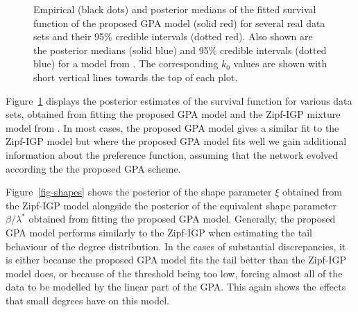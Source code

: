 \documentclass[
  sn-basic,
  10pt,
]{sn-jnl}
\theoremstyle{plain}
\theoremstyle{plain}
\theoremstyle{remark}
\begin{document}
\begin{figure}


\caption{\label{fig-real1}Empirical (black dots) and posterior medians
of the fitted survival function of the proposed GPA model (solid red)
for several real data sets and their 95\% credible intervals (dotted
red). Also shown are the posterior medians (solid blue) and 95\%
credible intervals (dotted blue) for a model from \citet{Lee24}. The
corresponding \(k_0\) values are shown with short vertical lines towards
the top of each plot.}

\end{figure}%

Figure~\ref{fig-real1} displays the posterior estimates of the survival
function for various data sets, obtained from fitting the proposed GPA
model and the Zipf-IGP mixture model from \citet{Lee24}. In most cases,
the proposed GPA model gives a similar fit to the Zipf-IGP model but
where the proposed GPA model fits well we gain additional information
about the preference function, assuming that the network evolved
according the the proposed GPA scheme.

Figure~\ref{fig-shapes} shows the posterior of the shape parameter
\(\xi\) obtained from the Zipf-IGP model alongside the posterior of the
equivalent shape parameter \(\beta/\lambda^*\) obtained from fitting the
proposed GPA model. Generally, the proposed GPA model performs similarly
to the Zipf-IGP when estimating the tail behaviour of the degree
distribution. In the cases of substantial discrepancies, it is either
because the proposed GPA model fits the tail better than the Zipf-IGP
model does, or because of the threshold being too low, forcing almost
all of the data to be modelled by the linear part of the GPA. This again
shows the effects that small degrees have on this model.
\end{document}
